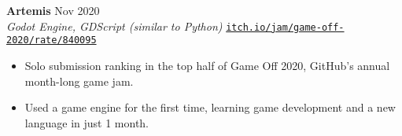 \documentclass[letterpaper,10pt]{extarticle}
\begin{document}
\noindent
\textbf{Artemis} \hfill Nov 2020\\ %
\textit{Godot Engine, GDScript (similar to Python)} \hfill \texttt{\href{https://itch.io/jam/game-off-2020/rate/840095}{itch.io/jam/game-off-2020/rate/840095}}
\begin{itemize}
    \item Solo submission ranking in the top half of Game Off 2020, GitHub's annual month-long game jam.
    \item Used a game engine for the first time, learning game development and a new language in just 1 month.
\end{itemize}



\end{document}
